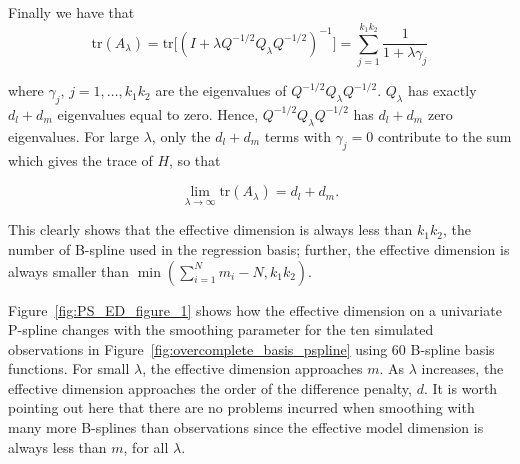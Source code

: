 \noindent
Finally we have that
\begin{equation*}
\mbox{tr}\left(A_\lambda \right) = \mbox{tr}\bigg[\left(I + \lambda Q^{-{1/2}}Q_\lambda Q^{-{1/2}}  \right)^{-1} \bigg] = \sum_{j=1}^{k_1k_2} \frac{1}{1 + \lambda \gamma_j}
\end{equation*}

 where $\gamma_j$, $j=1,\dots,k_1k_2$ are the eigenvalues of $Q^{-{1/2}}Q_\lambda Q^{-{1/2}}$. $Q_\lambda$ has exactly $d_l + d_m$ eigenvalues equal to zero. Hence, $Q^{-{1/2}}Q_\lambda Q^{-{1/2}} $ has $d_l + d_m$ zero eigenvalues. For large $\lambda$, only the $d_l + d_m$ terms with $\gamma_j=0$ contribute to the sum which gives the trace of $H$, so that
 
 \[
\lim_{\lambda \rightarrow \infty  } \mbox{tr}\left(A_\lambda\right) = d_l + d_m.
 \]

%
%

This clearly shows that the effective dimension is always less than $k_1k_2$, the number of B-spline used in the regression basis; further, the effective dimension is always smaller than $\min\left(\sum_{i=1}^N m_i - N, k_1k_2\right)$. 

Figure~\ref{fig:PS_ED_figure_1} shows how the effective dimension on a univariate P-spline changes with the smoothing parameter for the ten simulated observations in Figure~\ref{fig:overcomplete_basis_pspline} using 60 B-spline basis functions. For small $\lambda$, the effective dimension approaches $m$. As $\lambda$ increases, the effective dimension approaches the order of the difference penalty, $d$. It is worth pointing out here that there are no problems incurred when smoothing with many more B-splines than observations since the effective model dimension is always less than $m$, for all $\lambda$. 

